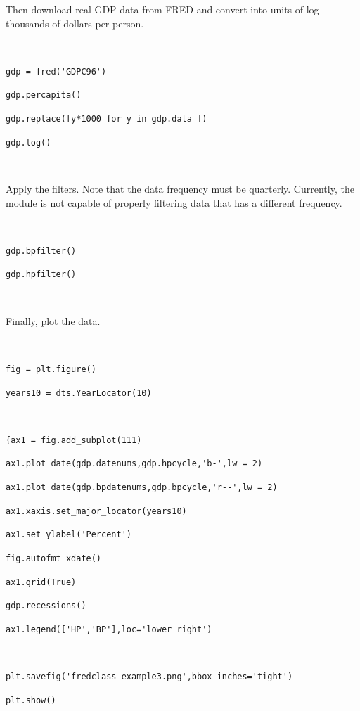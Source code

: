 \documentclass[11pt,fleqn]{article}
\newcommand{\ttt}{\texttt}
\begin{document}
\noindent Then download real GDP data from FRED and convert into units of log thousands of dollars per person.

\

\begin{minipage}{6.5in}
\verb!gdp = fred('GDPC96')!

\ttt{gdp.percapita()}

\ttt{gdp.replace([y*1000 for y in gdp.data ])}

\ttt{gdp.log()}

\

\end{minipage}

\noindent Apply the filters. Note that the data frequency must be quarterly. Currently, the module is not capable of properly filtering data that has a different frequency.

\

\begin{minipage}{6in}
\ttt{gdp.bpfilter()}

\ttt{gdp.hpfilter()}

\

\end{minipage}

\noindent Finally, plot the data.

\

\begin{minipage}{6in}
\ttt{fig = plt.figure()}

\ttt{years10  = dts.YearLocator(10)}

\

\verb!{ax1 = fig.add_subplot(111)!

\verb!ax1.plot_date(gdp.datenums,gdp.hpcycle,'b-',lw = 2)!

\verb!ax1.plot_date(gdp.bpdatenums,gdp.bpcycle,'r--',lw = 2)!

\verb!ax1.xaxis.set_major_locator(years10)!

\verb!ax1.set_ylabel('Percent')!

\verb!fig.autofmt_xdate()!

\ttt{ax1.grid(True)}

\ttt{gdp.recessions()}

\verb!ax1.legend(['HP','BP'],loc='lower right')!

\

\verb!plt.savefig('fredclass_example3.png',bbox_inches='tight')!

\ttt{plt.show()}

\

\end{minipage}
\end{document}
